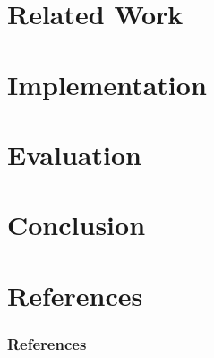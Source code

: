 \documentclass{beamer}
\begin{document}
\section{Related Work}
\section{Implementation}
\section{Evaluation}
\section{Conclusion}

\appendix %

\section{References}
\begin{frame}[allowframebreaks]
  \frametitle{References}
  
  
\end{frame}
\end{document}

